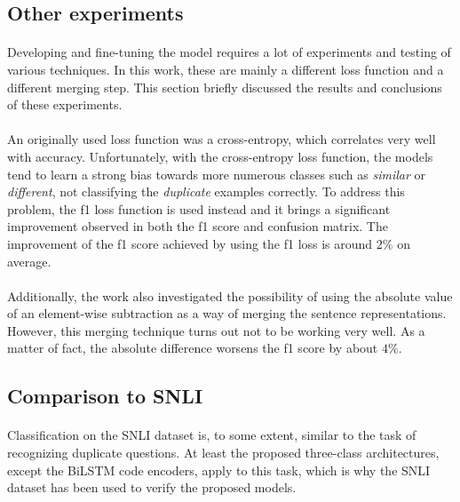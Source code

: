 \subsection{Other experiments}
\paragraph{}
Developing and fine-tuning the model requires a lot of experiments and testing of various techniques. In this work, these are mainly a different loss function and a different merging step. This section briefly discussed the results and conclusions of these experiments.

\paragraph{}
An originally used loss function was a cross-entropy, which correlates very well with accuracy. Unfortunately, with the cross-entropy loss function, the models tend to learn a strong bias towards more numerous classes such as \textit{similar} or \textit{different}, not classifying the \textit{duplicate} examples correctly. To address this problem, the f1 loss function is used instead and it brings a significant improvement observed in both the f1 score and confusion matrix. The improvement of the f1 score achieved by using the f1 loss is around $2\%$ on average.

\paragraph{}
Additionally, the work also investigated the possibility of using the absolute value of an element-wise subtraction as a way of merging the sentence representations. However, this merging technique turns out not to be working very well. As a matter of fact, the absolute difference worsens the f1 score by about $4\%$.

\subsection{Comparison to SNLI}
\paragraph{}
Classification on the SNLI dataset is, to some extent, similar to the task of recognizing duplicate questions. At least the proposed three-class architectures, except the BiLSTM code encoders, apply to this task, which is why the SNLI dataset has been used to verify the proposed models.

